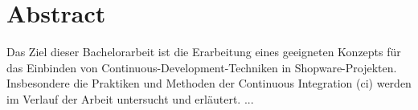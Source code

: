 
\section*{Abstract} \label{sec:00-abstract}


Das Ziel dieser Bachelorarbeit ist die Erarbeitung eines geeigneten Konzepts für das Einbinden von
Continuous-Development-Techniken in Shopware-Projekten.
Insbesondere die Praktiken und Methoden der Continuous Integration (\acrshort{ci}) werden im Verlauf der Arbeit
untersucht und erläutert.
...

\clearpage
